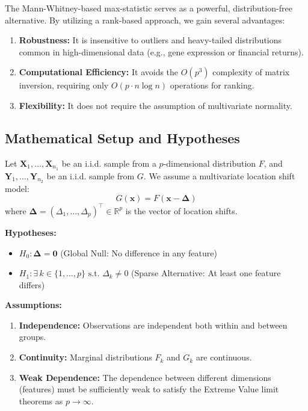 \documentclass[10pt]{article}
\begin{document}
The Mann-Whitney-based max-statistic serves as a powerful, distribution-free alternative. By utilizing a rank-based approach, we gain several advantages:
\begin{enumerate}
    \item \textbf{Robustness:} It is insensitive to outliers and heavy-tailed distributions common in high-dimensional data (e.g., gene expression or financial returns).
    \item \textbf{Computational Efficiency:} It avoids the $O(p^3)$ complexity of matrix inversion, requiring only $O(p \cdot n \log n)$ operations for ranking.
    \item \textbf{Flexibility:} It does not require the assumption of multivariate normality.
\end{enumerate}

\subsection{Mathematical Setup and Hypotheses}
Let $\mathbf{X}_1, \dots, \mathbf{X}_{n_1}$ be an i.i.d. sample from a $p$-dimensional distribution $F$, and $\mathbf{Y}_1, \dots, \mathbf{Y}_{n_2}$ be an i.i.d. sample from $G$. We assume a multivariate location shift model:
$$ G(\mathbf{x}) = F(\mathbf{x} - \boldsymbol{\Delta}) $$
where $\boldsymbol{\Delta} = (\Delta_1, \dots, \Delta_p)^\top \in \mathbb{R}^p$ is the vector of location shifts.

\textbf{Hypotheses:}
\begin{itemize}
    \item $H_0: \boldsymbol{\Delta} = \mathbf{0}$ (Global Null: No difference in any feature)
    \item $H_1: \exists \, k \in \{1, \dots, p\} \text{ s.t. } \Delta_k \neq 0$ (Sparse Alternative: At least one feature differs)
\end{itemize}

\textbf{Assumptions:}
\begin{enumerate}
    \item \textbf{Independence:} Observations are independent both within and between groups.
    \item \textbf{Continuity:} Marginal distributions $F_k$ and $G_k$ are continuous.
    \item \textbf{Weak Dependence:} The dependence between different dimensions (features) must be sufficiently weak to satisfy the Extreme Value limit theorems as $p \to \infty$.
\end{enumerate}
\end{document}
